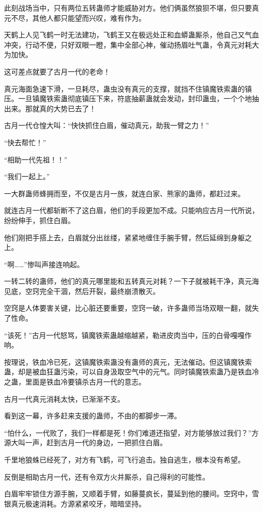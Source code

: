 \begin{this_body}
此刻战场当中，只有两位五转蛊师才能威胁对方。他们俩虽然狼狈不堪，但只要真元不尽，其他人都只能望而兴叹，难有作为。

天鹤上人见飞鹤一时无法建功，飞鹤王又在极远处正和血蟒蛊厮杀，他自己又气血冲突，行动不便，只好双眼一瞪，集中全部心神，催动扬眉吐气蛊，令真元对耗大为加快。

这可差点就要了古月一代的老命！

真元海面急速下滑，一旦耗尽，蛊虫没有真元的支撑，就挡不住镇魔铁索蛊的镇压。一旦镇魔铁索蛊彻底镇压下来，符底抽薪蛊就会发动，封印蛊虫，一个个地抽出来。那就真的大势已去了！

古月一代仓惶大叫：“快快抓住白眉，催动真元，助我一臂之力！”

“快去帮忙！”

“相助一代先祖！！”

“我们一起上。”

一大群蛊师蜂拥而至，不仅是古月一族，就连白家、熊家的蛊师，都赶过来。

就连古月一代都斩断不了这白眉，他们的手段更加不成。只能响应古月一代所说，纷纷伸手，抓住白眉。

他们刚把手搭上去，白眉就分出丝缕，紧紧地缠住手腕手臂，然后延绵到身躯之上。

“啊……”惨叫声接连响起。

一转二转的蛊师，他们的真元哪里能和五转真元对耗？一下子就被耗干净，真元海见底，空窍完全干涸，然后开裂，最终崩溃散灭。

空窍是人体要害关键，比心脏还要重要，空窍一破，许多蛊师当场双眼一翻，就失了性命。

“该死！”古月一代怒骂，镇魔铁索蛊越缩越紧，勒进皮肉当中，压的白骨嘎嘎作响。

按理说，铁血冷已死，这镇魔铁索蛊没有蛊师的真元，无法催动。但这镇魔铁索蛊，却是被血狂蛊污染，可以自身汲取空气中的元气。同时镇魔铁索蛊乃是铁血冷之蛊，里面是铁血冷要镇杀古月一代的意志。

古月一代真元消耗太快，已渐渐不支。

看到这一幕，许多赶来支援的蛊师，不由的都脚步一滞。

“怕什么，一代败了，我们一样都是死！你们难道还指望，对方能够放过我们？”方源大叫一声，赶到古月一代的身边，一把抓住白眉。

千里地狼蛛已经死了，对方有飞鹤，可飞行追击。独自逃生，根本没有希望。

反倒是相助古月一代，还有令双方火并厮杀，自己得利的可能性。

白眉牢牢锁住方源手腕，又顺着手臂，如藤蔓疯长，蔓延到他的腰间。空窍中，雪银真元极速消耗。方源紧紧咬牙，暗暗坚持。


\end{this_body}
